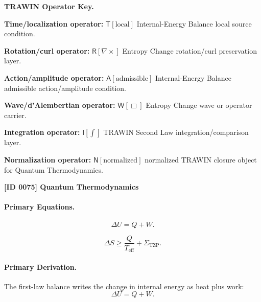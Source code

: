 \par\vspace{0.45\baselineskip}
\noindent\begin{minipage}[t]{\linewidth}
\begingroup
\small
\raggedright
\textbf{TRAWIN Operator Key.}\par
\noindent\textbf{Time/localization operator:} $\mathsf{T}\!\left[\mathrm{local}\right]$ Internal-Energy Balance local source condition.\par
\noindent\textbf{Rotation/curl operator:} $\mathsf{R}\!\left[\nabla\times\right]$ Entropy Change rotation/curl preservation layer.\par
\noindent\textbf{Action/amplitude operator:} $\mathsf{A}\!\left[\mathrm{admissible}\right]$ Internal-Energy Balance admissible action/amplitude condition.\par
\noindent\textbf{Wave/d'Alembertian operator:} $\mathsf{W}\!\left[\Box\right]$ Entropy Change wave or operator carrier.\par
\noindent\textbf{Integration operator:} $\mathsf{I}\!\left[\int\right]$ TRAWIN Second Law integration/comparison layer.\par
\noindent\textbf{Normalization operator:} $\mathsf{N}\!\left[\mathrm{normalized}\right]$ normalized TRAWIN closure object for Quantum Thermodynamics.\par
\endgroup
\end{minipage}

\clearpage
\noindent\textbf{[ID 0075] Quantum Thermodynamics}\par
\vspace{0.35em}
\paragraph{Primary Equations.}
\begin{equation}
\Delta U = Q+W .
\end{equation}

\begin{equation}
\Delta S
\geq
\frac{Q}{T_{\mathrm{eff}}}
+
\Sigma_{\mathrm{TZP}} .
\end{equation}

\paragraph{Primary Derivation.}
The first-law balance writes the change in internal energy as heat plus work:
\begin{equation}
\Delta U=Q+W .
\end{equation}

